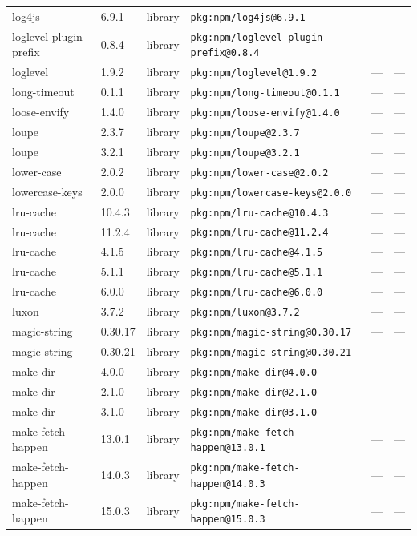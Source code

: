 \documentclass[11pt]{article}
\begin{document}
\begin{longtable}{|l|l|l|p{2.2cm}|l|p{4cm}|}
log4js & 6.9.1 & library & \texttt{pkg:npm/log4js@6.9.1} & — & — \\
loglevel-plugin-prefix & 0.8.4 & library & \texttt{pkg:npm/loglevel-plugin-prefix@0.8.4} & — & — \\
loglevel & 1.9.2 & library & \texttt{pkg:npm/loglevel@1.9.2} & — & — \\
long-timeout & 0.1.1 & library & \texttt{pkg:npm/long-timeout@0.1.1} & — & — \\
loose-envify & 1.4.0 & library & \texttt{pkg:npm/loose-envify@1.4.0} & — & — \\
loupe & 2.3.7 & library & \texttt{pkg:npm/loupe@2.3.7} & — & — \\
loupe & 3.2.1 & library & \texttt{pkg:npm/loupe@3.2.1} & — & — \\
lower-case & 2.0.2 & library & \texttt{pkg:npm/lower-case@2.0.2} & — & — \\
lowercase-keys & 2.0.0 & library & \texttt{pkg:npm/lowercase-keys@2.0.0} & — & — \\
lru-cache & 10.4.3 & library & \texttt{pkg:npm/lru-cache@10.4.3} & — & — \\
lru-cache & 11.2.4 & library & \texttt{pkg:npm/lru-cache@11.2.4} & — & — \\
lru-cache & 4.1.5 & library & \texttt{pkg:npm/lru-cache@4.1.5} & — & — \\
lru-cache & 5.1.1 & library & \texttt{pkg:npm/lru-cache@5.1.1} & — & — \\
lru-cache & 6.0.0 & library & \texttt{pkg:npm/lru-cache@6.0.0} & — & — \\
luxon & 3.7.2 & library & \texttt{pkg:npm/luxon@3.7.2} & — & — \\
magic-string & 0.30.17 & library & \texttt{pkg:npm/magic-string@0.30.17} & — & — \\
magic-string & 0.30.21 & library & \texttt{pkg:npm/magic-string@0.30.21} & — & — \\
make-dir & 4.0.0 & library & \texttt{pkg:npm/make-dir@4.0.0} & — & — \\
make-dir & 2.1.0 & library & \texttt{pkg:npm/make-dir@2.1.0} & — & — \\
make-dir & 3.1.0 & library & \texttt{pkg:npm/make-dir@3.1.0} & — & — \\
make-fetch-happen & 13.0.1 & library & \texttt{pkg:npm/make-fetch-happen@13.0.1} & — & — \\
make-fetch-happen & 14.0.3 & library & \texttt{pkg:npm/make-fetch-happen@14.0.3} & — & — \\
make-fetch-happen & 15.0.3 & library & \texttt{pkg:npm/make-fetch-happen@15.0.3} & — & — \\

\end{longtable}
\end{document}
